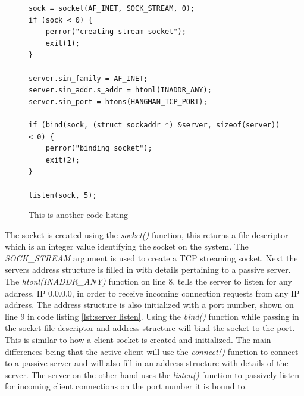 \documentclass[12pt,a4paper,titlepage]{article}
\begin{document}
\begin{figure}[H]
\begin{lstlisting}
sock = socket(AF_INET, SOCK_STREAM, 0); 
if (sock < 0) {
	perror("creating stream socket");
	exit(1);
}

server.sin_family = AF_INET;
server.sin_addr.s_addr = htonl(INADDR_ANY);
server.sin_port = htons(HANGMAN_TCP_PORT);

if (bind(sock, (struct sockaddr *) &server, sizeof(server)) < 0) {
	perror("binding socket");
	exit(2);
}

listen(sock, 5);
\end{lstlisting}
	\caption{This is another code listing \cite{stevensunp}}
	\label{code:raig header source}
\end{figure}

The socket is created using the \textit{socket()} function, this returns a file descriptor which is an integer value identifying the socket on the system. The \textit{SOCK\_STREAM} argument is used to create a TCP streaming socket. Next the servers address structure is filled in with details pertaining to a passive server. The \textit{htonl(INADDR\_ANY)} function on line 8, tells the server to listen for any address, IP 0.0.0.0, in order to receive incoming connection requests from any IP address. The address structure is also initialized with a port number, shown on line 9 in code listing \ref{lst:server listen}. Using the \textit{bind()} function while passing in the socket file descriptor and address structure will bind the socket to the port.\\ 

This is similar to how a client socket is created and initialized. The main differences being that the active client will use the \textit{connect()} function to connect to a passive server and will also fill in an address structure with details of the server. The server on the other hand uses the \textit{listen()} function to passively listen for incoming client connections on the port number it is bound to. \\
\end{document}
